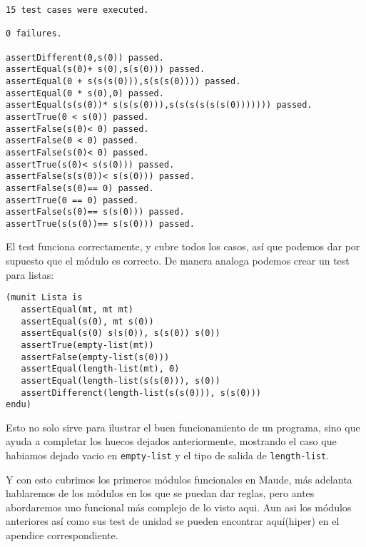 \begin{verbatim}
15 test cases were executed.

0 failures.

assertDifferent(0,s(0)) passed.
assertEqual(s(0)+ s(0),s(s(0))) passed.
assertEqual(0 + s(s(s(0))),s(s(s(0)))) passed.
assertEqual(0 * s(0),0) passed.
assertEqual(s(s(0))* s(s(s(0))),s(s(s(s(s(s(0))))))) passed.
assertTrue(0 < s(0)) passed.
assertFalse(s(0)< 0) passed.
assertFalse(0 < 0) passed.
assertFalse(s(0)< 0) passed.
assertTrue(s(0)< s(s(0))) passed.
assertFalse(s(s(0))< s(s(0))) passed.
assertFalse(s(0)== 0) passed.
assertTrue(0 == 0) passed.
assertFalse(s(0)== s(s(0))) passed.
assertTrue(s(s(0))== s(s(0))) passed.
\end{verbatim}

El test funciona correctamente, y cubre todos los casos, así que podemos dar por supuesto que el módulo es correcto. De manera analoga podemos crear un test para listas: \par

\begin{verbatim}
(munit Lista is
   assertEqual(mt, mt mt)
   assertEqual(s(0), mt s(0))
   assertEqual(s(0) s(s(0)), s(s(0)) s(0))
   assertTrue(empty-list(mt))
   assertFalse(empty-list(s(0)))
   assertEqual(length-list(mt), 0)
   assertEqual(length-list(s(s(0))), s(0))
   assertDifferenct(length-list(s(s(0))), s(s(0)))
endu)
\end{verbatim}

Esto no solo sirve para ilustrar el buen funcionamiento de un programa, sino que ayuda a completar los huecos dejados anteriormente, mostrando el caso que habiamos dejado vacio en \texttt{empty-list} y el tipo de salida de \texttt{length-list}. \par

Y con esto cubrimos los primeros módulos funcionales en Maude, más adelanta hablaremos de los módulos en los que se puedan dar reglas, pero antes abordaremos uno funcional más complejo de lo visto aqui. Aun asi los módulos anteriores así como sus test de unidad se pueden encontrar aquí(hiper) en el apendice correspondiente.\par 


